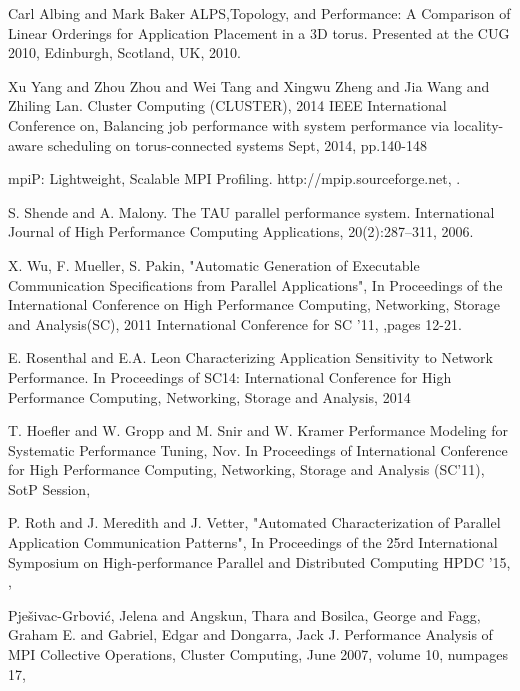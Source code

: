 \documentclass[conference]{IEEEtran}
\begin{document}
\begin{thebibliography}{10}
Carl Albing and Mark Baker
\newblock ALPS,Topology, and Performance: A Comparison of Linear Orderings for 
Application Placement in a 3D torus.
\newblock Presented at the CUG 2010, Edinburgh, Scotland, UK, 2010.

Xu Yang and Zhou Zhou and Wei Tang and Xingwu Zheng and Jia Wang and Zhiling Lan.
\newblock Cluster Computing (CLUSTER), 2014 IEEE International Conference on,
\newblock Balancing job performance with system performance via locality-aware scheduling on torus-connected systems
\newblock Sept, 2014,
\newblock pp.140-148

\newblock mpiP: Lightweight, Scalable MPI Profiling.
\newblock http://mpip.sourceforge.net, 
.

S. Shende and A. Malony. 
\newblock The TAU parallel performance system. 
\newblock International Journal of High Performance Computing Applications, 20(2):287–311, 2006.

X. Wu, F. Mueller, S. Pakin, 
\newblock "Automatic Generation of Executable Communication Specifications from Parallel Applications", 
\newblock In {Proceedings of the International Conference on High Performance Computing, Networking, Storage and Analysis(SC), 2011 International Conference for}
\newblock SC '11,
,pages 12-21.


E. Rosenthal and E.A. Leon
\newblock Characterizing Application Sensitivity to Network Performance.
\newblock  In {Proceedings of SC14: International
Conference for High Performance Computing, Networking, Storage and Analysis},
2014

T. Hoefler and W. Gropp and M. Snir and W. Kramer
\newblock Performance Modeling for Systematic Performance Tuning,
\newblock Nov.
\newblock In {Proceedings of International Conference for High Performance Computing, Networking, Storage and Analysis (SC'11), SotP Session,
}

P. Roth and J. Meredith and J. Vetter,
\newblock "Automated Characterization of Parallel Application Communication Patterns",
In Proceedings of the 25rd International Symposium on High-performance Parallel and Distributed Computing
\newblock HPDC '15,
,


Pje\v{s}ivac-Grbovi\'{c}, Jelena and Angskun, Thara and Bosilca, George and Fagg, Graham E. and Gabriel, Edgar and Dongarra, Jack J.
\newblock Performance Analysis of MPI Collective Operations,
\newblock Cluster Computing,
\newblock June 2007,
\newblock volume 10,
\newblock numpages 17,
 


\end{thebibliography}
\end{document}
